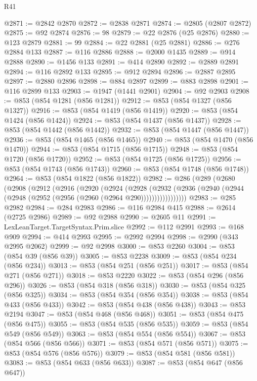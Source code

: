 \begin{lexlean}{R41}
\begin{coremodule}
@2871 := @2842 @2870
@2872 := @2838 @2871
@2874 := @2805 (@2807 @2872)
@2875 := @92 @2874
@2876 := 98
@2879 := @22 @2876 (@25 @2876)
@2880 := @123 @2879
@2881 := 99
@2884 := @22 @2881 (@25 @2881)
@2886 := @276 @2884 @133
@2887 := @116 @2886
@2888 := @2000 @1435
@2889 := @914 @2888
@2890 := @1456 @133
@2891 := @414 @2890
@2892 := @2889 @2891
@2894 := @116 @2892 @133
@2895 := @912 @2894
@2896 := @2887 @2895
@2897 := @2880 @2896
@2898 := @884 @2897
@2899 := @883 @2898
@2901 := @116 @2899 @133
@2903 := @1947 (@1441 @2901)
@2904 := @92 @2903
@2908 := @853 (@854 @1281 (@856 @1281))
@2912 := @853 (@854 @1327 (@856 @1327))
@2916 := @853 (@854 @1419 (@856 @1419))
@2920 := @853 (@854 @1424 (@856 @1424))
@2924 := @853 (@854 @1437 (@856 @1437))
@2928 := @853 (@854 @1442 (@856 @1442))
@2932 := @853 (@854 @1447 (@856 @1447))
@2936 := @853 (@854 @1465 (@856 @1465))
@2940 := @853 (@854 @1470 (@856 @1470))
@2944 := @853 (@854 @1715 (@856 @1715))
@2948 := @853 (@854 @1720 (@856 @1720))
@2952 := @853 (@854 @1725 (@856 @1725))
@2956 := @853 (@854 @1743 (@856 @1743))
@2960 := @853 (@854 @1748 (@856 @1748))
@2964 := @853 (@854 @1822 (@856 @1822))
@2982 := @286
    (@289
      (@2680
        (@2908
          (@2912
            (@2916
              (@2920
                (@2924
                  (@2928
                    (@2932
                      (@2936 (@2940 (@2944 (@2948 (@2952 (@2956 (@2960 (@2964 @290)))))))))))))))))
@2983 := @285 @2982
@2984 := @284 @2983
@2986 := @116 @2984 @415
@2988 := @2614 (@2725 @2986)
@2989 := @92 @2988
@2990 := @2605 @11
@2991 := LexLeanTarget.TargetSyntax.Prim.slice
@2992 := @112 @2991
@2993 := @168 @909
@2994 := @414 @2993
@2995 := @2992 @2994
@2998 := @2990 (@343 @2995 @2062)
@2999 := @92 @2998
@3000 := @853 @2260
@3004 := @853 (@854 @39 (@856 @39))
@3005 := @853 @2238
@3009 := @853 (@854 @234 (@856 @234))
@3013 := @853 (@854 @251 (@856 @251))
@3017 := @853 (@854 @271 (@856 @271))
@3018 := @853 @2220
@3022 := @853 (@854 @296 (@856 @296))
@3026 := @853 (@854 @318 (@856 @318))
@3030 := @853 (@854 @325 (@856 @325))
@3034 := @853 (@854 @354 (@856 @354))
@3038 := @853 (@854 @433 (@856 @433))
@3042 := @853 (@854 @438 (@856 @438))
@3043 := @853 @2194
@3047 := @853 (@854 @468 (@856 @468))
@3051 := @853 (@854 @475 (@856 @475))
@3055 := @853 (@854 @535 (@856 @535))
@3059 := @853 (@854 @549 (@856 @549))
@3063 := @853 (@854 @554 (@856 @554))
@3067 := @853 (@854 @566 (@856 @566))
@3071 := @853 (@854 @571 (@856 @571))
@3075 := @853 (@854 @576 (@856 @576))
@3079 := @853 (@854 @581 (@856 @581))
@3083 := @853 (@854 @633 (@856 @633))
@3087 := @853 (@854 @647 (@856 @647))

\end{coremodule}
\end{lexlean}
